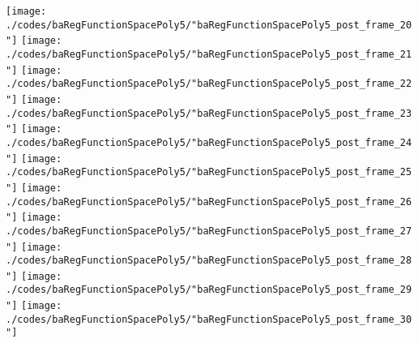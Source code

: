 \begin{frame}{\insertsection}
\begin{center}
{\begin{animateinline}{15}
				 \texttt{[image: ./codes/baRegFunctionSpacePoly5/"baRegFunctionSpacePoly5\_post\_frame\_20"]}\newframe
				 \texttt{[image: ./codes/baRegFunctionSpacePoly5/"baRegFunctionSpacePoly5\_post\_frame\_21"]}\newframe
				 \texttt{[image: ./codes/baRegFunctionSpacePoly5/"baRegFunctionSpacePoly5\_post\_frame\_22"]}\newframe
				 \texttt{[image: ./codes/baRegFunctionSpacePoly5/"baRegFunctionSpacePoly5\_post\_frame\_23"]}\newframe
				 \texttt{[image: ./codes/baRegFunctionSpacePoly5/"baRegFunctionSpacePoly5\_post\_frame\_24"]}\newframe
				 \texttt{[image: ./codes/baRegFunctionSpacePoly5/"baRegFunctionSpacePoly5\_post\_frame\_25"]}\newframe
				 \texttt{[image: ./codes/baRegFunctionSpacePoly5/"baRegFunctionSpacePoly5\_post\_frame\_26"]}\newframe
				 \texttt{[image: ./codes/baRegFunctionSpacePoly5/"baRegFunctionSpacePoly5\_post\_frame\_27"]}\newframe
				 \texttt{[image: ./codes/baRegFunctionSpacePoly5/"baRegFunctionSpacePoly5\_post\_frame\_28"]}\newframe
				 \texttt{[image: ./codes/baRegFunctionSpacePoly5/"baRegFunctionSpacePoly5\_post\_frame\_29"]}\newframe
				 \texttt{[image: ./codes/baRegFunctionSpacePoly5/"baRegFunctionSpacePoly5\_post\_frame\_30"]}
			 \end{animateinline}
			}
	\end{center}
    
\end{frame}


